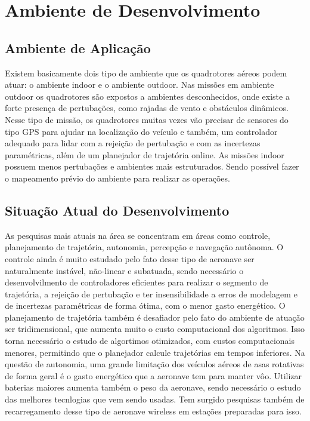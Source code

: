 \chapter{Ambiente de Desenvolvimento}
\label{chap:ambiente}

\section{Ambiente de Aplicação}

Existem basicamente dois tipo de ambiente que os quadrotores aéreos podem atuar: o ambiente indoor e o ambiente outdoor. Nas missões em ambiente outdoor os quadrotores são expostos a ambientes desconhecidos, onde existe a forte presença de pertubações, como rajadas de vento e obstáculos dinâmicos. Nesse tipo de missão, os quadrotores muitas vezes vão precisar de sensores do tipo GPS para ajudar na localização do veículo e também, um controlador adequado para lidar com a rejeição de pertubação e com as incertezas paramétricas, além de um planejador de trajetória online. As missões indoor possuem menos pertubações e ambientes mais estruturados. Sendo possível fazer o mapeamento prévio do ambiente para realizar as operações.

\section{Situação Atual do Desenvolvimento}

As pesquisas mais atuais na área se concentram em áreas como controle, planejamento de trajetória, autonomia, percepção e navegação autônoma. O controle ainda é muito estudado pelo fato desse tipo de aeronave ser naturalmente instável, não-linear e subatuada, sendo necessário o desenvolvilmento de controladores eficientes para realizar o segmento de trajetória, a rejeição de pertubação e ter insensibilidade a erros de modelagem e de incertezas paramétricas de forma ótima, com o menor gasto energético. O planejamento de trajetória também é desafiador pelo fato do ambiente de atuação ser tridimensional, que aumenta muito o custo computacional dos algoritmos. Isso torna necessário o estudo de algortimos otimizados, com custos computacionais menores, permitindo que o planejador calcule trajetórias em tempos inferiores. Na questão de autonomia, uma grande limitação dos veículos aéreos de asas rotativas de forma geral é o gasto energético que a aeronave tem para manter vôo. Utilizar baterias maiores aumenta também o peso da aeronave, sendo necessário o estudo das melhores tecnlogias que vem sendo usadas. Tem surgido pesquisas também de recarregamento desse tipo de aeronave wireless em estações preparadas para isso.

